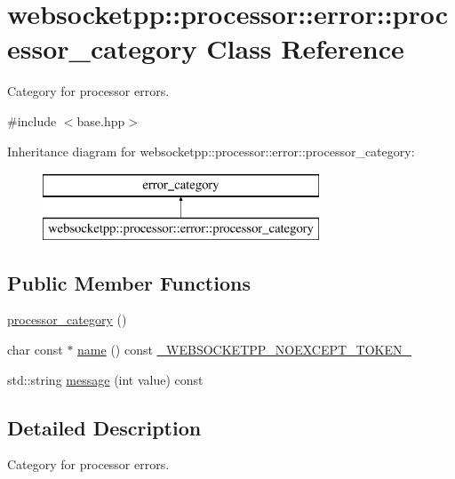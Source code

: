 \hypertarget{classwebsocketpp_1_1processor_1_1error_1_1processor__category}{}\section{websocketpp\+:\+:processor\+:\+:error\+:\+:processor\+\_\+category Class Reference}
\label{classwebsocketpp_1_1processor_1_1error_1_1processor__category}


Category for processor errors.  




{\ttfamily \#include $<$base.\+hpp$>$}

Inheritance diagram for websocketpp\+:\+:processor\+:\+:error\+:\+:processor\+\_\+category\+:\begin{figure}[H]
\begin{center}
\leavevmode
\includegraphics[height=2.000000cm]{classwebsocketpp_1_1processor_1_1error_1_1processor__category}
\end{center}
\end{figure}
\subsection*{Public Member Functions}
\begin{DoxyCompactItemize}
\item 
\hyperlink{classwebsocketpp_1_1processor_1_1error_1_1processor__category_a6be64fa8b803699305182fc74b90f953}{processor\+\_\+category} ()
\item 
char const $\ast$ \hyperlink{classwebsocketpp_1_1processor_1_1error_1_1processor__category_a587e3e9c5c86807a6ca0d15505e34486}{name} () const \hyperlink{boost__config_8hpp_aa19747404a5f2fe9c9eb9e9d2e48f26c}{\+\_\+\+W\+E\+B\+S\+O\+C\+K\+E\+T\+P\+P\+\_\+\+N\+O\+E\+X\+C\+E\+P\+T\+\_\+\+T\+O\+K\+E\+N\+\_\+}
\item 
std\+::string \hyperlink{classwebsocketpp_1_1processor_1_1error_1_1processor__category_af74bad2654388c5229f95d6362d24f0f}{message} (int value) const 
\end{DoxyCompactItemize}


\subsection{Detailed Description}
Category for processor errors. 

